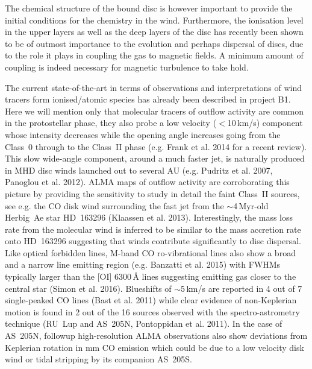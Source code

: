 \documentclass[10pt,fleqn,twoside]{article}
\begin{document}
The chemical structure of the bound disc is however important to provide the initial conditions for the chemistry in the wind. Furthermore, the ionisation level in the upper layers as well as the deep layers of the disc has recently been shown to be of outmost importance to the evolution and perhaps dispersal of discs, due to the role it plays in coupling the gas to magnetic fields. A minimum amount of coupling is indeed necessary for magnetic turbulence to take hold. 

The current state-of-the-art in  terms of observations and interpretations of wind tracers form ionised/atomic species has already been described in project B1. Here we will mention only that molecular tracers of outflow activity are common in the protostellar phase, they also probe a low velocity ($<$10\,km/s) component whose intensity decreases while the opening angle increases going from the Class~0 through to the Class~II phase (e.g. Frank et al. 2014 for a recent review). This slow wide-angle component, around a much faster jet, is naturally produced in MHD disc winds launched out to several AU (e.g. Pudritz et al. 2007, Panoglou et al. 2012). ALMA maps of outflow activity are corroborating this picture by providing the sensitivity to study in detail the faint Class~II sources, see e.g. the CO disk wind surrounding the fast jet from the $\sim$4\,Myr-old Herbig~Ae star HD~163296 (Klaassen et al. 2013). Interestingly, the mass loss rate from the molecular wind is inferred to be similar to the mass accretion rate onto HD~163296 suggesting that winds contribute significantly to disc dispersal. Like optical forbidden lines, M-band CO ro-vibrational lines also show a broad and a narrow line emitting region (e.g. Banzatti et al. 2015) with FWHMs typically larger than the [OI] 6300\,\AA{} lines suggesting emitting gas closer to the central star (Simon et al. 2016). Blueshifts of $\sim$5\,km/s are reported in 4 out of  7 single-peaked CO lines (Bast et al. 2011) while clear evidence of non-Keplerian motion is found in 2 out of the 16 sources observed with the spectro-astrometry technique (RU~Lup and AS~205N, Pontoppidan et al. 2011). In the case of AS~205N, followup high-resolution ALMA observations also show deviations from Keplerian rotation in mm CO emission which could be due to a low velocity disk wind or tidal stripping by its companion AS~205S.
\end{document}
